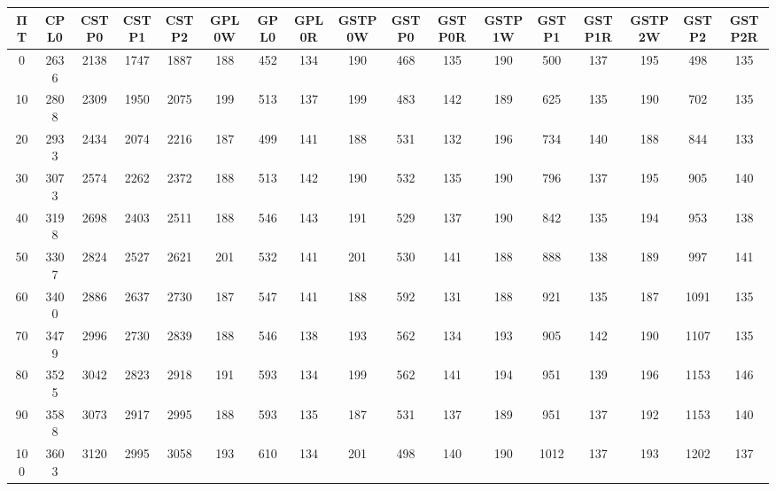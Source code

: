 \begin{tabular}{|c|c|c|c|c|c|c|c|c|c|c|c|c|c|c|c|c|}
\hline
ΠΤ&CPL0&CSTP0&CSTP1&CSTP2&GPL0W&GPL0&GPL0R&GSTP0W&GSTP0&GSTP0R&GSTP1W&GSTP1&GSTP1R&GSTP2W&GSTP2&GSTP2R\\
\hline
\hline
0&2636&2138&1747&1887&188&452&134&190&468&135&190&500&137&195&498&135\\
\hline
10&2808&2309&1950&2075&199&513&137&199&483&142&189&625&135&190&702&135\\
\hline
20&2933&2434&2074&2216&187&499&141&188&531&132&196&734&140&188&844&133\\
\hline
30&3073&2574&2262&2372&188&513&142&190&532&135&190&796&137&195&905&140\\
\hline
40&3198&2698&2403&2511&188&546&143&191&529&137&190&842&135&194&953&138\\
\hline
50&3307&2824&2527&2621&201&532&141&201&530&141&188&888&138&189&997&141\\
\hline
60&3400&2886&2637&2730&187&547&141&188&592&131&188&921&135&187&1091&135\\
\hline
70&3479&2996&2730&2839&188&546&138&193&562&134&193&905&142&190&1107&135\\
\hline
80&3525&3042&2823&2918&191&593&134&199&562&141&194&951&139&196&1153&146\\
\hline
90&3588&3073&2917&2995&188&593&135&187&531&137&189&951&137&192&1153&140\\
\hline
100&3603&3120&2995&3058&193&610&134&201&498&140&190&1012&137&193&1202&137\\
\hline
\end{tabular}
